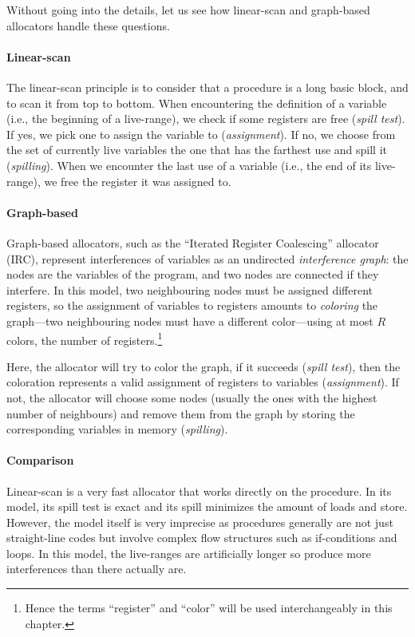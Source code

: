 {Without going into the details, let us see how linear-scan and graph-based allocators handle these questions.

\paragraph{Linear-scan} The linear-scan principle is to consider that a procedure is a long basic block, and to scan it from top to bottom.
When encountering the definition of a variable (i.e., the beginning of a live-range), we check if some registers are free (\emph{spill test}).
If yes, we pick one to assign the variable to (\emph{assignment}). If no, we choose from the set of currently live variables the one that has the farthest use and spill it (\emph{spilling}).
When we encounter the last use of a variable (i.e., the end of its live-range), we free the register it was assigned to.

\paragraph{Graph-based}
Graph-based allocators, such as the ``Iterated Register Coalescing'' allocator (IRC), represent interferences of variables as an undirected \emph{interference graph}: the nodes are the variables of the program, and two nodes are connected if they interfere.
In this model, two neighbouring nodes must be assigned different registers, so the assignment of variables to registers amounts to \emph{coloring} the graph---two neighbouring nodes must have a different color---using at most $R$ colors, the number of registers.\footnote{Hence the terms ``register'' and ``color'' will be used interchangeably in this chapter.}

Here, the allocator will try to color the graph, if it succeeds (\emph{spill test}), then the coloration represents a valid assignment of registers to variables (\emph{assignment}). If not, the allocator will choose some nodes (usually the ones with the highest number of neighbours) and remove them from the graph by storing the corresponding variables in memory (\emph{spilling}).


\paragraph{Comparison}

Linear-scan is a very fast allocator that works directly on the procedure.
In its model, its spill test is exact and its spill minimizes the amount of loads and store.
However, the model itself is very imprecise as procedures generally are not just straight-line codes but involve complex flow structures such as if-conditions and loops.
In this model, the live-ranges are artificially longer so produce more interferences than there actually are.

}
